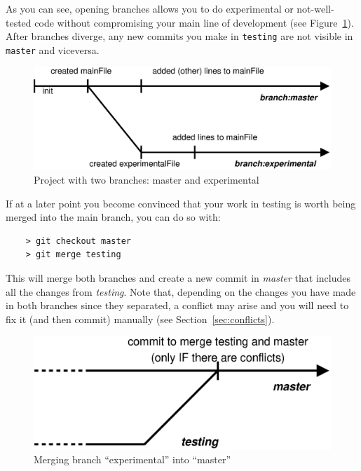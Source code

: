 As you can see, opening branches allows you to do experimental or
not-well-tested code without compromising your main line of
development (see Figure~\ref{fig:git-example-3}). 
After branches diverge, any new commits you make in \verb+testing+ are not
visible in \verb+master+ and viceversa. 

\begin{figure}[htbp!]
  \centering
  \includegraphics[width=\textwidth]{gfx/commit_history_3.eps}
  \caption{Project with two branches: master and experimental}
  \label{fig:git-example-3}
\end{figure}

If at a later point you become convinced that your work
in testing is worth being merged into the main branch, you can do so
with:

\begin{verbatim}
    > git checkout master
    > git merge testing
\end{verbatim}

This will merge both branches and create a new commit in \emph{master}
that includes all the changes from \emph{testing}. Note that,
depending on the changes you have made in both branches since they
separated, a conflict may arise and you will need to 
fix it (and then commit) manually (see Section~\ref{sec:conflicts}).

\begin{figure}[htbp!]
  \centering
  \includegraphics[width=\textwidth]{gfx/commit_history_4.eps}
  \caption{Merging branch ``experimental'' into ``master''}
  \label{fig:git-example-4}
\end{figure}

